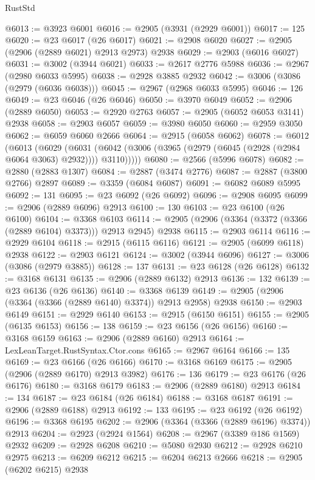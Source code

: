 \begin{lexlean}{RustStd}
\begin{coremodule}
{\begin{coremodule}
{{{{{{{{{{{{{{{{{{{{{{{{{{{{{{{{{{{{{{{{{{{{{{{{{{{{{{{{{{{{{{{{{{{{{{{{{{{{{{@6013 := @3923 @6001
@6016 := @2905 (@3931 (@2929 @6001))
@6017 := 125
@6020 := @23 @6017 (@26 @6017)
@6021 := @2908 @6020
@6027 := @2905 (@2906 (@2889 @6021) @2913 @2973) @2938
@6029 := @2903 (@6016 @6027)
@6031 := @3002 (@3944 @6021)
@6033 := @2617 @2776 @5988
@6036 := @2967 (@2980 @6033 @5995)
@6038 := @2928 @3885 @2932
@6042 := @3006 (@3086 (@2979 (@6036 @6038)))
@6045 := @2967 (@2968 @6033 @5995)
@6046 := 126
@6049 := @23 @6046 (@26 @6046)
@6050 := @3970 @6049
@6052 := @2906 (@2889 @6050)
@6053 := @2920 @2763
@6057 := @2905 (@6052 @6053 @3141) @2938
@6058 := @2903 @6057
@6059 := @3980 @6050
@6060 := @2959 @3050
@6062 := @6059 @6060 @2666
@6064 := @2915 (@6058 @6062)
@6078 := @6012
    (@6013
      (@6029
        (@6031 (@6042 (@3006 (@3965 (@2979 (@6045 (@2928 (@2984 @6064 @3063) @2932)))) @3110)))))
@6080 := @2566 (@5996 @6078)
@6082 := @2880 (@2883 @1307)
@6084 := @2887 (@3474 @2776)
@6087 := @2887 (@3800 @2766) @2897
@6089 := @3359 (@6084 @6087)
@6091 := @6082 @6089 @5995
@6092 := 131
@6095 := @23 @6092 (@26 @6092)
@6096 := @2908 @6095
@6099 := @2906 (@2889 @6096) @2913
@6100 := 130
@6103 := @23 @6100 (@26 @6100)
@6104 := @3368 @6103
@6114 := @2905 (@2906 (@3364 (@3372 (@3366 (@2889 @6104) @3373))) @2913 @2945) @2938
@6115 := @2903 @6114
@6116 := @2929 @6104
@6118 := @2915 (@6115 @6116)
@6121 := @2905 (@6099 @6118) @2938
@6122 := @2903 @6121
@6124 := @3002 (@3944 @6096)
@6127 := @3006 (@3086 (@2979 @3885))
@6128 := 137
@6131 := @23 @6128 (@26 @6128)
@6132 := @3168 @6131
@6135 := @2906 (@2889 @6132) @2913
@6136 := 132
@6139 := @23 @6136 (@26 @6136)
@6140 := @3368 @6139
@6149 := @2905 (@2906 (@3364 (@3366 (@2889 @6140) @3374)) @2913 @2958) @2938
@6150 := @2903 @6149
@6151 := @2929 @6140
@6153 := @2915 (@6150 @6151)
@6155 := @2905 (@6135 @6153)
@6156 := 138
@6159 := @23 @6156 (@26 @6156)
@6160 := @3168 @6159
@6163 := @2906 (@2889 @6160) @2913
@6164 := LexLeanTarget.RustSyntax.Ctor.cons
@6165 := @2967 @6164
@6166 := 135
@6169 := @23 @6166 (@26 @6166)
@6170 := @3168 @6169
@6175 := @2905 (@2906 (@2889 @6170) @2913 @3982)
@6176 := 136
@6179 := @23 @6176 (@26 @6176)
@6180 := @3168 @6179
@6183 := @2906 (@2889 @6180) @2913
@6184 := 134
@6187 := @23 @6184 (@26 @6184)
@6188 := @3168 @6187
@6191 := @2906 (@2889 @6188) @2913
@6192 := 133
@6195 := @23 @6192 (@26 @6192)
@6196 := @3368 @6195
@6202 := @2906 (@3364 (@3366 (@2889 @6196) @3374)) @2913
@6204 := @2923 (@2924 @1564)
@6208 := @2967 (@3389 @186 @1569) @2932
@6209 := @2928 @6208
@6210 := @5080 @2930
@6212 := @2928 @6210 @2975
@6213 := @6209 @6212
@6215 := @6204 @6213 @2666
@6218 := @2905 (@6202 @6215) @2938
}}}}}}}}}}}}}}}}}}}}}}}}}}}}}}}}}}}}}}}}}}}}}}}}}}}}}}}}}}}}}}}}}}}}}}}}}}}}}}
\end{coremodule}}
\end{coremodule}
\end{lexlean}
